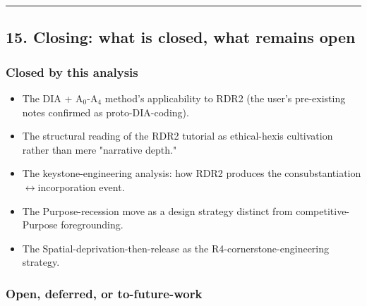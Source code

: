 \documentclass[11pt]{report}
\begin{document}
\vspace{0.4em}\hrule\vspace{0.8em}


\subsection{15. Closing: what is closed, what remains open}


\subsubsection{Closed by this analysis}


\begin{itemize}
\item The DIA + A$_0$-A$_4$ method's applicability to RDR2 (the user's pre-existing notes confirmed as proto-DIA-coding).
\item The structural reading of the RDR2 tutorial as ethical-hexis cultivation rather than mere "narrative depth."
\item The keystone-engineering analysis: how RDR2 produces the consubstantiation$\leftrightarrow$\allowbreak incorporation event.
\item The Purpose-recession move as a design strategy distinct from competitive-Purpose foregrounding.
\item The Spatial-deprivation-then-release as the R4-cornerstone-engineering strategy.
\end{itemize}


\subsubsection{Open, deferred, or to-future-work}
\end{document}
